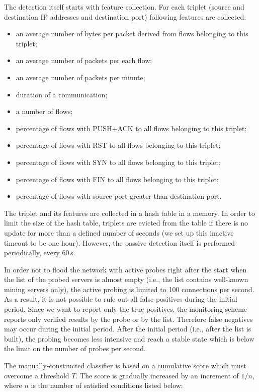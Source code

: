 \documentclass[preprint,12pt,3p]{elsarticle}
\begin{document}
The detection itself starts with feature collection. 
For each triplet (source and destination IP addresses and destination port) following features are collected:
\begin{itemize}
\item an average number of bytes per packet derived from flows belonging to this triplet;
\item an average number of packets per each flow;
\item an average number of packets per minute;
\item duration of a communication;
\item a number of flows;
\item percentage of flows with PUSH+ACK to all flows belonging to this triplet;
\item percentage of flows with RST to all flows belonging to this triplet;
\item percentage of flows with SYN to all flows belonging to this triplet;
\item percentage of flows with FIN to all flows belonging to this triplet;
\item percentage of flows with source port greater than destination port.
\end{itemize}

The triplet and its features are collected in a hash table in a memory.
In order to limit the size of the hash table, triplets are evicted from the table if there is no update for more than a defined number of seconds (we set up this inactive timeout to be one hour). 
However, the passive detection itself is performed periodically, every 60\,s.

In order not to flood the network with active probes right after the start when the list of the probed servers is almost empty (i.e., the list contains well-known mining servers only), the active probing is limited to 100 connections per second. 
As a result, it is not possible to rule out all false positives during the initial period. 
Since we want to report only the true positives, the monitoring scheme reports only verified results by the probe or by the list. 
Therefore false negatives may occur during the initial period.
After the initial period (i.e., after the list is built), the probing becomes less intensive and reach a stable state which is below the limit on the number of probes per second.

The manually-constructed classifier is based on a cumulative score which must overcome a threshold $T$. 
The score is gradually increased by an increment of $1/n$, where $n$ is the number of satisfied conditions listed below:
\end{document}
